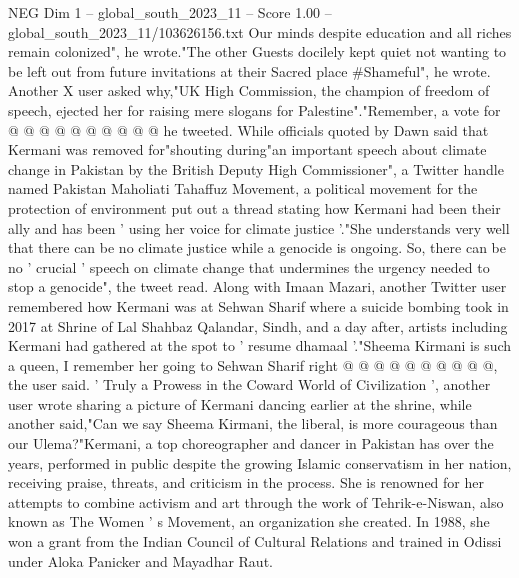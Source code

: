 \begin{textsample}{NEG Dim 1 – global\_south\_2023\_11 – Score 1.00 – global\_south\_2023\_11/103626156.txt}
Our minds despite education and all riches remain colonized", he wrote."The other Guests docilely kept quiet not wanting to be left out from future invitations at their Sacred place \#Shameful", he wrote.
Another X user asked why,"UK High Commission, the champion of freedom of speech, ejected her for raising mere slogans for Palestine"."Remember, a vote for @ @ @ @ @ @ @ @ @ @ he tweeted.
While officials quoted by Dawn said that Kermani was removed for"shouting during"an important speech about climate change in Pakistan by the British Deputy High Commissioner", a Twitter handle named Pakistan Maholiati Tahaffuz Movement, a political movement for the protection of environment put out a thread stating how Kermani had been their ally and has been ' using her voice for climate justice '."She understands very well that there can be no climate justice while a genocide is ongoing.
So, there can be no ' crucial ' speech on climate change that undermines the urgency needed to stop a genocide", the tweet read.
Along with Imaan Mazari, another Twitter user remembered how Kermani was at Sehwan Sharif where a suicide bombing took in 2017 at Shrine of Lal Shahbaz Qalandar, Sindh, and a day after, artists including Kermani had gathered at the spot to ' resume dhamaal '."Sheema Kirmani is such a queen, I remember her going to Sehwan Sharif right @ @ @ @ @ @ @ @ @ @, the user said. ' Truly a Prowess in the Coward World of Civilization ', another user wrote sharing a picture of Kermani dancing earlier at the shrine, while another said,"Can we say Sheema Kirmani, the liberal, is more courageous than our Ulema?"Kermani, a top choreographer and dancer in Pakistan has over the years, performed in public despite the growing Islamic conservatism in her nation, receiving praise, threats, and criticism in the process.
She is renowned for her attempts to combine activism and art through the work of Tehrik-e-Niswan, also known as The Women ' s Movement, an organization she created.
In 1988, she won a grant from the Indian Council of Cultural Relations and trained in Odissi under Aloka Panicker and Mayadhar Raut.

\end{textsample}
